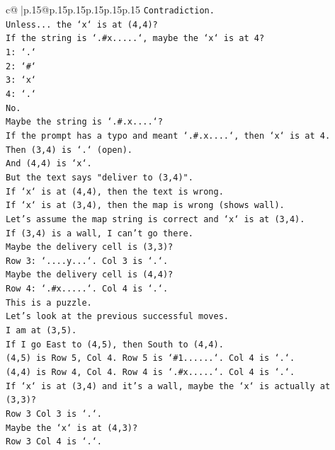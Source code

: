 \documentclass{article}
\begin{document}
{\begin{supertabular}{c@{$\;$}|p{.15\linewidth}@{}p{.15\linewidth}p{.15\linewidth}p{.15\linewidth}p{.15\linewidth}p{.15\linewidth}}
{{{\texttt{Contradiction.} \\
\texttt{Unless... the `x` is at (4,4)?} \\
\texttt{If the string is `.\#x.....`, maybe the `x` is at 4?} \\
\texttt{1: `.`} \\
\texttt{2: `\#`} \\
\texttt{3: `x`} \\
\texttt{4: `.`} \\
\texttt{No.} \\
\texttt{Maybe the string is `.\#.x....`?} \\
\texttt{If the prompt has a typo and meant `.\#.x....`, then `x` is at 4.} \\
\texttt{Then (3,4) is `.` (open).} \\
\texttt{And (4,4) is `x`.} \\
\texttt{But the text says "deliver to (3,4)".} \\
\texttt{If `x` is at (4,4), then the text is wrong.} \\
\texttt{If `x` is at (3,4), then the map is wrong (shows wall).} \\
\texttt{Let's assume the map string is correct and `x` is at (3,4).} \\
\texttt{If (3,4) is a wall, I can't go there.} \\
\texttt{Maybe the delivery cell is (3,3)?} \\
\texttt{Row 3: `....y...`. Col 3 is `.`.} \\
\texttt{Maybe the delivery cell is (4,4)?} \\
\texttt{Row 4: `.\#x.....`. Col 4 is `.`.} \\
\texttt{This is a puzzle.} \\
\texttt{Let's look at the previous successful moves.} \\
\texttt{I am at (3,5).} \\
\texttt{If I go East to (4,5), then South to (4,4).} \\
\texttt{(4,5) is Row 5, Col 4. Row 5 is `\#1......`. Col 4 is `.`.} \\
\texttt{(4,4) is Row 4, Col 4. Row 4 is `.\#x.....`. Col 4 is `.`.} \\
\texttt{If `x` is at (3,4) and it's a wall, maybe the `x` is actually at (3,3)?} \\
\texttt{Row 3 Col 3 is `.`.} \\
\texttt{Maybe the `x` is at (4,3)?} \\
\texttt{Row 3 Col 4 is `.`.} \\
}}}
\end{supertabular}}
\end{document}
